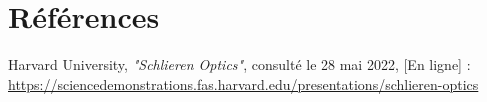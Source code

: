 \section*{Références}
\parindent0pt
\begin{enumerate}[label = {[\arabic*]}]
	\item Harvard University, \textit{"Schlieren Optics"}, consulté le 28 mai 2022, [En ligne] : \small\url{https://sciencedemonstrations.fas.harvard.edu/presentations/schlieren-optics}
	\label{ref:LaTeX}
\end{enumerate}